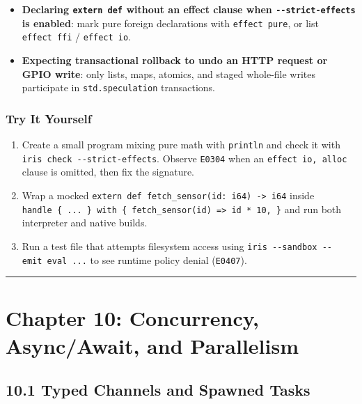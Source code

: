 \documentclass[
  english,
  oneside]{book}
\providecommand{\tightlist}{%
  \setlength{\itemsep}{0pt}\setlength{\parskip}{0pt}}
\begin{document}
\begin{itemize}
\tightlist
\item
  \textbf{Declaring \texttt{extern\ def} without an effect clause when
  \texttt{-\/-strict-effects} is enabled}: mark pure foreign
  declarations with \texttt{effect\ pure}, or list \texttt{effect\ ffi}
  / \texttt{effect\ io}.
\item
  \textbf{Expecting transactional rollback to undo an HTTP request or
  GPIO write}: only lists, maps, atomics, and staged whole-file writes
  participate in \texttt{std.speculation} transactions.
\end{itemize}

\subsection{Try It Yourself}\label{try-it-yourself-8}

\begin{enumerate}
\def\labelenumi{\arabic{enumi}.}
\tightlist
\item
  Create a small program mixing pure math with \texttt{println} and
  check it with \texttt{iris\ check\ -\/-strict-effects}. Observe
  \texttt{E0304} when an \texttt{effect\ io,\ alloc} clause is omitted,
  then fix the signature.
\item
  Wrap a mocked
  \texttt{extern\ def\ fetch\_sensor(id:\ i64)\ -\textgreater{}\ i64}
  inside
  \texttt{handle\ \{\ ...\ \}\ with\ \{\ fetch\_sensor(id)\ =\textgreater{}\ id\ *\ 10,\ \}}
  and run both interpreter and native builds.
\item
  Run a test file that attempts filesystem access using
  \texttt{iris\ -\/-sandbox\ -\/-emit\ eval\ ...} to see runtime policy
  denial (\texttt{E0407}).
\end{enumerate}

\begin{center}\rule{0.5\linewidth}{0.5pt}\end{center}

\chapter{Chapter 10: Concurrency, Async/Await, and
Parallelism}\label{chapter-10-concurrency-asyncawait-and-parallelism}

\section{10.1 Typed Channels and Spawned
Tasks}\label{typed-channels-and-spawned-tasks}
\end{document}
